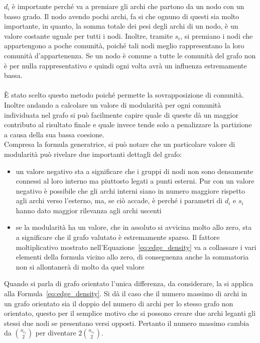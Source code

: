 $d_i$ è importante perché va a premiare gli archi che partono da un nodo con un basso grado. Il nodo avendo pochi archi, fa si che ognuno di questi sia molto importante, in quanto, la somma totale dei pesi degli archi di un nodo, è un valore costante uguale per tutti i nodi. Inoltre, tramite $s_i$, si premiano i nodi che appartengono a poche comunità, poiché tali nodi meglio rappresentano la loro comunità d'appartenenza. Se un nodo è comune a tutte le comunità del grafo non è per nulla rappresentativo e quindi ogni volta avrà un influenza estremamente bassa.\\
\\
È stato scelto questo metodo poiché permette la sovrapposizione di comunità. Inoltre andando a calcolare un valore di modularità per ogni comunità individuata nel grafo si può facilmente capire quale di queste dà un maggior contributo al risultato finale e quale invece tende solo a penalizzare la partizione a causa della sua bassa coesione.\\
Compresa la formula generatrice, si può notare che un particolare valore di modularità può rivelare  due importanti dettagli del grafo:
\begin{itemize}
	\item un valore negativo sta a significare che i gruppi di nodi non sono densamente connessi al loro interno ma piuttosto legati a punti esterni. Pur con un valore negativo è possibile che gli archi interni siano in numero maggiore rispetto agli archi verso l'esterno, ma, se ciò accade, è perché i parametri di $d_i$ e $s_i$ hanno dato maggior rilevanza agli archi uscenti
	\item se la modularità ha un valore, che in assoluto si avvicina molto allo zero, sta a significare che il grafo valutato è estremamente sparso. Il fattore moltiplicativo mostrato nell'Equazione~\ref{eq:edge_density} va a collassare i vari elementi della formula vicino allo zero, di conseguenza anche la sommatoria non si allontanerà di molto da quel valore
\end{itemize}
Quando si parla di grafo orientato l'unica differenza, da considerare, la si applica alla Formula~\ref{eq:edge_density}. Si dà il caso che il numero massimo di archi in un grafo orientato sia il doppio del numero di archi per lo stesso grafo non orientato, questo per il semplice motivo che si possono creare due archi leganti gli stessi due nodi se presentano versi opposti. Pertanto il numero massimo cambia da $\binom{n_{c_r}}{2}$ per diventare $ 2\binom{n_{c_r}}{2}$.
%
%
